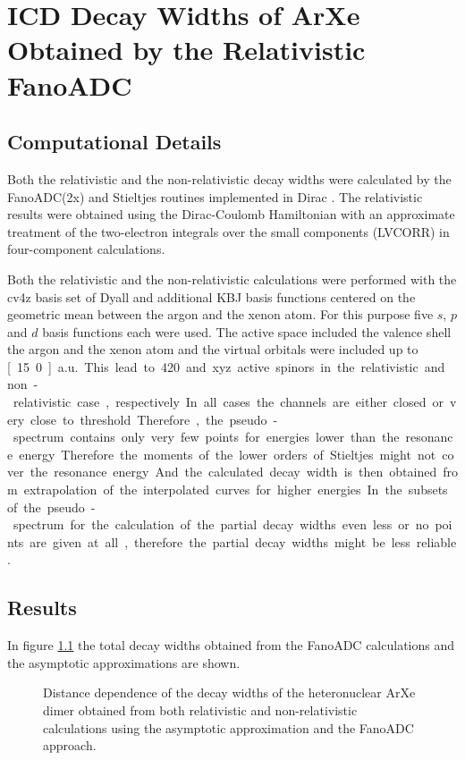 \chapter{\ac{ICD} Decay Widths of ArXe Obtained by the Relativistic FanoADC}
\section{Computational Details}
Both the relativistic and the non-relativistic decay widths were calculated by
the FanoADC(2x) and Stieltjes routines implemented in Dirac \cite{DIRAC13}.
The relativistic results were obtained using the
Dirac-Coulomb Hamiltonian with an approximate treatment of the two-electron
integrals over the small components (LVCORR)
in four-component calculations.

Both the relativistic and the non-relativistic calculations were performed
with the cv4z basis set of Dyall \cite{} and additional \ac{KBJ} \cite{Kaufmann89}
basis functions centered on the geometric mean between the argon and the xenon
atom. For this purpose five $s$, $p$ and $d$ basis functions each were used.
The active space included the valence shell the argon and the xenon atom and
the virtual orbitals were included up to \unit[15.0]{a.u.}. 
This lead to 420 and xyz active spinors in the relativistic and non-relativistic
case, respectively.

In all cases the channels are either closed or very close to threshold.
Therefore, the pseudo-spectrum contains only very few points for energies
lower than the resonance energy. Therefore the moments of the lower orders of
Stieltjes might not cover the resonance energy. And the calculated decay width
is then obtained from extrapolation of the interpolated curves for higher energies.
In the subsets of the pseudo-spectrum for the
calculation of the partial decay widths even less or no points are given at all,
therefore the partial decay widths might be less reliable.


\section{Results}
In figure \ref{figure:arxe_gamma_shift_fano} the total decay widths obtained
from the FanoADC calculations and the asymptotic approximations are shown.

\begin{figure}[]
  \centering
  
  \caption{Distance dependence of the decay widths of the heteronuclear
           ArXe dimer obtained from both relativistic and non-relativistic
           calculations using the asymptotic approximation and the FanoADC
           approach.}
  \label{figure:arxe_gamma_shift_fano}
\end{figure}

